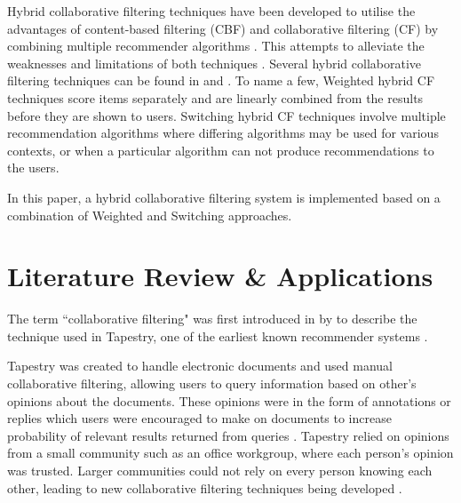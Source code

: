 
Hybrid collaborative filtering techniques have been developed to utilise the advantages of content-based filtering (CBF) and collaborative filtering (CF) by combining multiple recommender algorithms \cite{toward, spiegel2010hybrid}. This attempts to alleviate the weaknesses and limitations of both techniques \cite{toward, spiegel2010hybrid}. Several hybrid collaborative filtering techniques can be found in \cite{toward} and \cite{spiegel2010hybrid}. To name a few, Weighted \cite{spiegel2010hybrid} hybrid CF techniques score items separately and are linearly combined from the results before they are shown to users. Switching \cite{spiegel2010hybrid} hybrid CF techniques involve multiple recommendation algorithms where differing algorithms may be used for various contexts, or when a particular algorithm can not produce recommendations to the users. 

In this paper, a hybrid collaborative filtering system is implemented based on a combination of Weighted \cite{spiegel2010hybrid} and Switching \cite{spiegel2010hybrid} approaches. 

\section{Literature Review \& Applications}

The term ``collaborative filtering" was first introduced in \citeyear{goldberg1992using} by \citeauthor{goldberg1992using} to describe the technique used in Tapestry, one of the earliest known recommender systems \cite{koren2009matrix,  goldberg1992using, itembased, survey}.

Tapestry \cite{goldberg1992using} was created to handle electronic documents and used manual collaborative filtering, allowing users to query information based on other's opinions about the documents. These opinions were in the form of annotations or replies which users were encouraged to make on documents to increase probability of relevant results returned from queries \cite{schafer2007collaborative}. Tapestry relied on opinions from a small community such as an office workgroup, where each person's opinion was trusted. Larger communities could not rely on every person knowing each other, leading to new collaborative filtering techniques being developed \cite{itembased}. 

